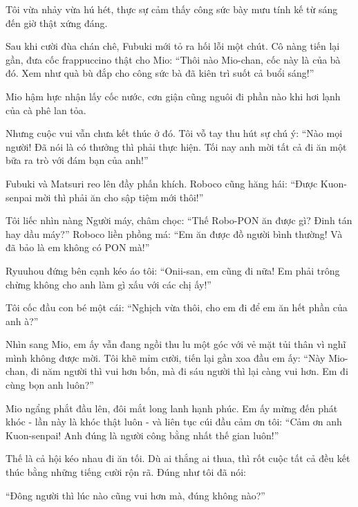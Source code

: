 \documentclass[../main.tex]{subfiles}
\begin{document}
Tôi vừa nhảy vừa hú hét, thực sự cảm thấy công sức bày mưu tính kế từ sáng đến giờ thật xứng đáng.

Sau khi cười đùa chán chê, Fubuki mới tỏ ra hối lỗi một chút. Cô nàng tiến lại gần, đưa cốc frappuccino thật cho Mio: ``Thôi nào Mio-chan, cốc này là của bà đó. Xem như quà bù đắp cho công sức bà đã kiên trì suốt cả buổi sáng!''

Mio hậm hực nhận lấy cốc nước, cơn giận cũng nguôi đi phần nào khi hơi lạnh của cà phê lan tỏa.

Nhưng cuộc vui vẫn chưa kết thúc ở đó. Tôi vỗ tay thu hút sự chú ý: ``Nào mọi người! Đã nói là có thưởng thì phải thực hiện. Tối nay anh mời tất cả đi ăn một bữa ra trò với đám bạn của anh!''

Fubuki và Matsuri reo lên đầy phấn khích. Roboco cũng hăng hái: ``Được Kuon-senpai mời thì phải ăn cho sập tiệm mới thôi!''

Tôi liếc nhìn nàng Người máy, châm chọc: ``Thế Robo-PON ăn được gì? Đinh tán hay dầu máy?'' Roboco liền phồng má: ``Em ăn được đồ người bình thường! Và đã bảo là em không có PON mà!''

Ryuuhou đứng bên cạnh kéo áo tôi: ``Onii-san, em cũng đi nữa! Em phải trông chừng không cho anh làm gì xấu với các chị ấy!''

Tôi cốc đầu con bé một cái: ``Nghịch vừa thôi, cho em đi để em ăn hết phần của anh à?''

Nhìn sang Mio, em ấy vẫn đang ngồi thu lu một góc với vẻ mặt tủi thân vì nghĩ mình không được mời. Tôi khẽ mỉm cười, tiến lại gần xoa đầu em ấy: ``Này Mio-chan, đi năm người thì vui hơn bốn, mà đi sáu người thì lại càng vui hơn. Em đi cùng bọn anh luôn?''

Mio ngẩng phắt đầu lên, đôi mắt long lanh hạnh phúc. Em ấy mừng đến phát khóc - lần này là khóc thật luôn - và liên tục cúi đầu cảm ơn tôi: ``Cảm ơn anh Kuon-senpai! Anh đúng là người công bằng nhất thế gian luôn!''

Thế là cả hội kéo nhau đi ăn tối. Dù ai thắng ai thua, thì rốt cuộc tất cả đều kết thúc bằng những tiếng cười rộn rã. Đúng như tôi đã nói:

``Đông người thì lúc nào cũng vui hơn mà, đúng không nào?''
\end{document}
